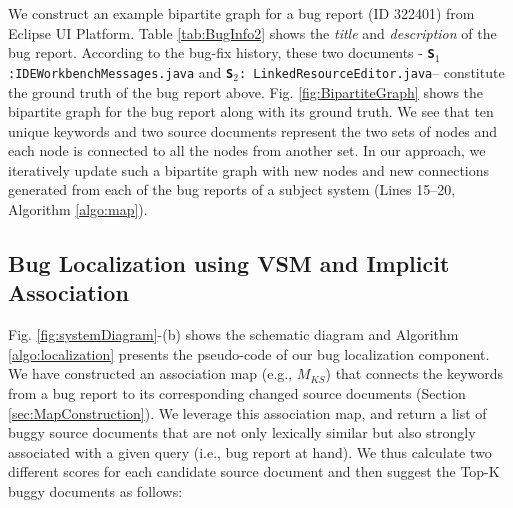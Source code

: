 \documentclass[conference]{IEEEtran}
\begin{document}
We construct an example bipartite graph for a bug report (ID 322401) from Eclipse UI Platform. Table \ref{tab:BugInfo2} shows the \textit{title} and \textit{description} of the bug report. According to the bug-fix history, these two documents - \texttt{\textbf{S$_1$}:IDEWorkbenchMessages.java} and \texttt{\textbf{S$_2$}: LinkedResourceEditor.java}-- constitute the ground truth of the bug report above. Fig. \ref{fig:BipartiteGraph} shows the bipartite graph for the bug report along with its ground truth. We see that ten unique keywords and two source documents represent the two sets of nodes and each node is connected to all the nodes from another set. In our approach, we iteratively update such a bipartite graph with new nodes and new connections generated from each of the bug reports of a subject system (Lines 15--20, Algorithm \ref{algo:map}).     



\subsection{Bug Localization using VSM and Implicit Association}\label{sec:vsm-assoc-sore}
Fig. \ref{fig:systemDiagram}-(b) shows the schematic diagram
and Algorithm \ref{algo:localization} presents the pseudo-code
of our bug localization component.
We have constructed an association map (e.g., $M_{KS}$) that connects the keywords from a bug report to its corresponding changed source documents (Section \ref{sec:MapConstruction}). We leverage this association map, and return a list of buggy source documents that are not only lexically similar but also strongly associated with a given query (i.e., bug report at hand). We thus calculate two different scores for each candidate source document and then suggest the Top-K buggy documents as follows:

\end{document}
